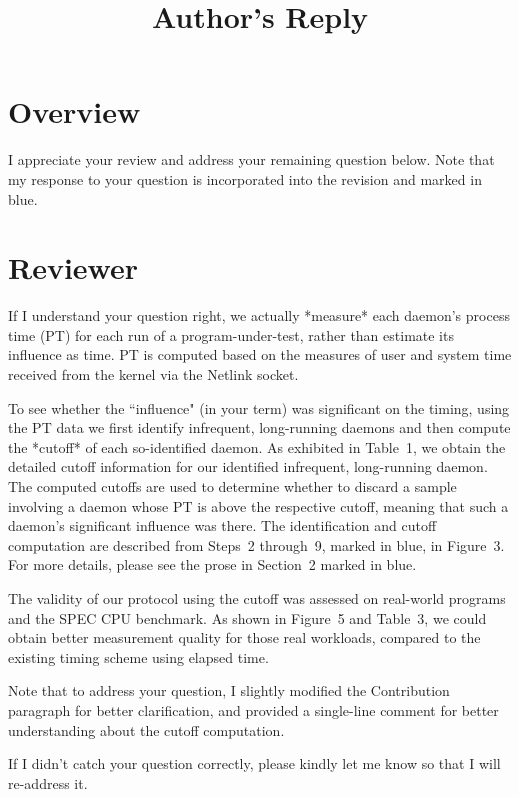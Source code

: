 \documentclass[10pt,letterpaper]{article}
\newenvironment{myindentpar}[1]%
{\begin{list}{}
         {\vspace{10pt}
					\setlength{\leftmargin}{#1}}
          \item[]
}
{\end{list}}
\newcommand{\rev}[1]{\begin{myindentpar}{.25in} {\em {\color{blue}{#1}}}\end{myindentpar}}
\begin{document}
\title{Author's Reply}
\author{}
\maketitle

\section*{Overview}\label{sec:overview}
I appreciate your review and address your remaining question below. 
Note that my response to your question is 
incorporated into the revision and marked in {\color{blue}blue}.


\clearpage
\section*{Reviewer}\label{sec:rev1}

\rev{
$<<$ Reviewer's comments to the author(s) $>>$

The manuscript is well revised.

However, I have a question how to estimate each daemon's influence as time.
The estimation is important for accuracy of your proposed method.

For acceptance, please clarify the estimation method and its validity.

}

If I understand your question right, 
we actually *measure* each daemon's process time (PT) for each run of a program-under-test, 
rather than estimate its influence as time. 
PT is computed based on the measures of user and system time received from the kernel via 
the Netlink socket. 

To see whether the ``influence" (in your term) was significant on the timing, 
using the PT data we first identify infrequent, long-running daemons and then compute the *cutoff* of each so-identified daemon. 
As exhibited in Table~1, we obtain the detailed cutoff information for our identified infrequent, long-running daemon. 
The computed cutoffs are used to determine whether to discard a sample involving 
a daemon whose PT is above the respective cutoff, meaning that such a daemon's significant influence was there. 
The identification and cutoff computation are described from Steps~2 through~9, marked in blue, in Figure~3. 
For more details, please see the prose in Section~2 marked in blue. 

The validity of our protocol using the cutoff was assessed on real-world programs and the SPEC CPU benchmark. 
As shown in Figure~5 and Table~3, we could obtain better measurement quality for those real workloads, compared to 
the existing timing scheme using elapsed time.  

Note that to address your question, 
I slightly modified the Contribution paragraph for better clarification, and provided 
a single-line comment for better understanding about the cutoff computation. 

If I didn't catch your question correctly, please kindly let me know so that I will re-address it. 
\end{document}
